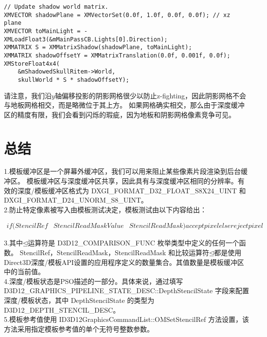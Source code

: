 \begin{lstlisting}
// Update shadow world matrix.
XMVECTOR shadowPlane = XMVectorSet(0.0f, 1.0f, 0.0f, 0.0f); // xz plane
XMVECTOR toMainLight = -XMLoadFloat3(&mMainPassCB.Lights[0].Direction);
XMMATRIX S = XMMatrixShadow(shadowPlane, toMainLight);
XMMATRIX shadowOffsetY = XMMatrixTranslation(0.0f, 0.001f, 0.0f);
XMStoreFloat4x4(
    &mShadowedSkullRitem->World,
    skullWorld * S * shadowOffsetY);
\end{lstlisting}

\begin{flushleft}
请注意，我们沿$y$轴偏移投影的阴影网格很少以防止z-fighting，因此阴影网格不会与地板网格相交，而是略微位于其上方。 如果网格确实相交，那么由于深度缓冲区的精度有限，我们会看到闪烁的瑕疵，因为地板和阴影网格像素竞争可见。
\end{flushleft}

\section{总结}
\begin{flushleft}
1.模板缓冲区是一个屏幕外缓冲区，我们可以用来阻止某些像素片段渲染到后台缓冲区。 模板缓冲区与深度缓冲区共享，因此具有与深度缓冲区相同的分辨率。有效的深度/模板缓冲区格式为 DXGI\_FORMAT\_D32\_FLOAT\_S8X24\_UINT 和 DXGI\_FORMAT\_D24\_UNORM\_S8\_UINT。\\

2.防止特定像素被写入由模板测试决定，模板测试由以下内容给出：\\
\end{flushleft}

\begin{align*}
if(StencilRef 
   & StencilReadMask Value 
   & StencilReadMask )
    accept pixel
else
    reject pixel
\end{align*}

\begin{flushleft}
3.其中$\unlhd$运算符是 D3D12\_COMPARISON\_FUNC 枚举类型中定义的任何一个函数。 StencilRef，StencilReadMask，StencilReadMask 和比较运算符$\unlhd$都是使用Direct3D深度/模板API设置的应用程序定义的数量集合。其值数量是模板缓冲区中的当前值。\\
4.深度/模板状态是PSO描述的一部分。具体来说，通过填写 D3D12\_GRAPHICS\_PIPELINE\_STATE\_DESC::DepthStencilState 字段来配置深度/模板状态，其中 DepthStencilState 的类型为 D3D12\_DEPTH\_STENCIL\_DESC。\\
5.模板参考值使用 ID3D12GraphicsCommandList::OMSetStencilRef 方法设置，该方法采用指定模板参考值的单个无符号整数参数。\\
\end{flushleft}


